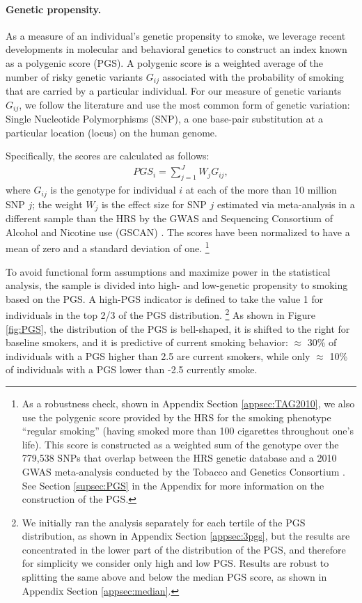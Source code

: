 \documentclass[11pt]{article}
\begin{document}
\paragraph{Genetic propensity.}
As a measure of an individual's genetic propensity to smoke, we leverage recent developments in molecular and behavioral genetics to construct an index known as a polygenic score (PGS).
A polygenic score is a weighted average of the number of risky genetic variants $G_{ij}$ associated with the probability of smoking that are carried by a particular individual.
For our measure of genetic variants $G_{ij}$, we follow the literature and use the most common form of genetic variation: Single Nucleotide Polymorphisms (SNP), a one base-pair substitution at a particular location (locus) on the human genome.

Specifically, the scores are calculated as follows:
\begin{align}
\label{eq:PGS}
PGS_i = \sum_{j=1}^{J} W_j G_{ij},
\end{align}
\normalsize where $G_{ij}$ is the genotype for individual $i$ at each of the more than 10 million SNP $j$; the weight $W_j$ is the effect size for SNP $j$ estimated via meta-analysis in a different sample than the HRS by the GWAS and Sequencing Consortium of Alcohol and Nicotine use (GSCAN) \citep{GSCAN2019gwas}.
The scores have been normalized to have a mean of zero and a standard deviation of one.%
\footnote{As a robustness check, shown in Appendix Section \ref{appsec:TAG2010}, we also use the polygenic score provided by the HRS \citep{HRSPGenscore2017} for the smoking phenotype ``regular smoking'' (having smoked more than 100 cigarettes throughout one's life).
This score is constructed as a weighted sum of the genotype over the 779,538 SNPs that overlap between the HRS genetic database and a 2010 GWAS meta-analysis conducted by the Tobacco and Genetics Consortium \citep{TAG2010}.
See Section \ref{supsec:PGS} in the Appendix for more information on the construction of the PGS.}

To avoid functional form assumptions and maximize power in the statistical analysis, the sample is divided into high- and low-genetic propensity to smoking based on the PGS.
A high-PGS indicator is defined to take the value 1 for individuals in the top 2/3 of the PGS distribution.%
\footnote{We initially ran the analysis separately for each tertile of the PGS distribution, as shown in Appendix Section \ref{appsec:3pgs}, but the results are concentrated in the lower part of the distribution of the PGS, and therefore for simplicity we consider only high and low PGS. Results are robust to splitting the same above and below the median PGS score, as shown in Appendix Section \ref{appsec:median}.}
As shown in Figure \ref{fig:PGS}, the distribution of the PGS is bell-shaped, it is shifted to the right for baseline smokers, and it is predictive of current smoking behavior: $\approx$ 30\% of individuals with a PGS higher than 2.5 are current smokers, while only $\approx$ 10\% of individuals with a PGS lower than -2.5 currently smoke.
\end{document}
